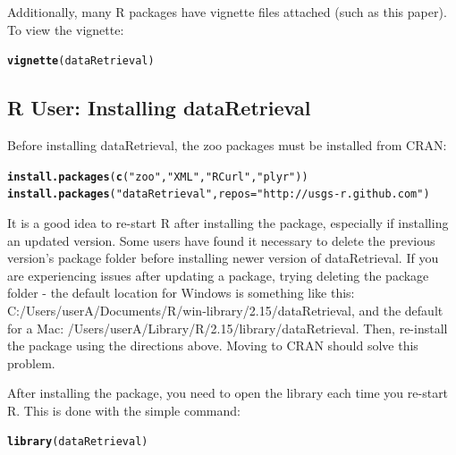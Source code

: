 \documentclass[a4paper,11pt]{article}\usepackage[]{graphicx}\usepackage[]{color}
\makeatletter
\newcommand{\hlstr}[1]{\textcolor[rgb]{0.192,0.494,0.8}{#1}}%
\newcommand{\hlstd}[1]{\textcolor[rgb]{0.345,0.345,0.345}{#1}}%
\newcommand{\hlkwc}[1]{\textcolor[rgb]{0.333,0.667,0.333}{#1}}%
\newcommand{\hlkwd}[1]{\textcolor[rgb]{0.737,0.353,0.396}{\textbf{#1}}}%
\newenvironment{kframe}{%
 \def\at@end@of@kframe{}%
 \ifinner\ifhmode%
  \def\at@end@of@kframe{\end{minipage}}%
  \begin{minipage}{\columnwidth}%
 \fi\fi%
 \def\FrameCommand##1{\hskip\@totalleftmargin \hskip-\fboxsep
 \colorbox{shadecolor}{##1}\hskip-\fboxsep
     \hskip-\linewidth \hskip-\@totalleftmargin \hskip\columnwidth}%
 \MakeFramed {\advance\hsize-\width
   \@totalleftmargin\z@ \linewidth\hsize
   \@setminipage}}%
 {\par\unskip\endMakeFramed%
 \at@end@of@kframe}
\newenvironment{knitrout}{}{} %
\makeatother
\begin{document}
Additionally, many R packages have vignette files attached (such as this paper). To view the vignette:
\begin{knitrout}
\color{fgcolor}\begin{kframe}
\begin{alltt}
\hlkwd{vignette}\hlstd{(dataRetrieval)}
\end{alltt}
\end{kframe}
\end{knitrout}



\subsection{R User: Installing dataRetrieval}
Before installing dataRetrieval, the zoo packages must be installed from CRAN:

\begin{knitrout}
\color{fgcolor}\begin{kframe}
\begin{alltt}
\hlkwd{install.packages}\hlstd{(}\hlkwd{c}\hlstd{(}\hlstr{"zoo"}\hlstd{,}\hlstr{"XML"}\hlstd{,}\hlstr{"RCurl"}\hlstd{,}\hlstr{"plyr"}\hlstd{))}
\hlkwd{install.packages}\hlstd{(}\hlstr{"dataRetrieval"}\hlstd{,} \hlkwc{repos}\hlstd{=}\hlstr{"http://usgs-r.github.com"}\hlstd{)}
\end{alltt}
\end{kframe}
\end{knitrout}


It is a good idea to re-start R after installing the package, especially if installing an updated version. Some users have found it necessary to delete the previous version's package folder before installing newer version of dataRetrieval. If you are experiencing issues after updating a package, trying deleting the package folder - the default location for Windows is something like this: C:/Users/userA/Documents/R/win-library/2.15/dataRetrieval, and the default for a Mac: /Users/userA/Library/R/2.15/library/dataRetrieval. Then, re-install the package using the directions above. Moving to CRAN should solve this problem.

After installing the package, you need to open the library each time you re-start R.  This is done with the simple command:
\begin{knitrout}
\color{fgcolor}\begin{kframe}
\begin{alltt}
\hlkwd{library}\hlstd{(dataRetrieval)}
\end{alltt}
\end{kframe}
\end{knitrout}
\end{document}
